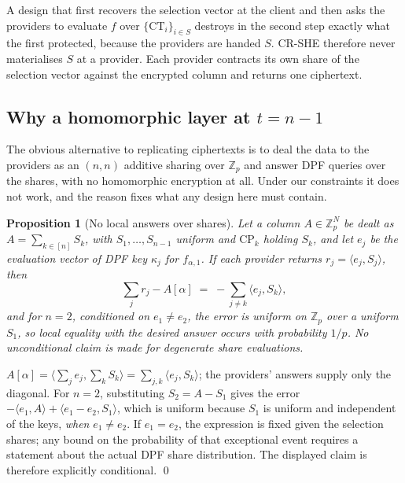\documentclass[a4paper,fleqn]{cas-sc}
\newtheorem{proposition}{Proposition}
\begin{document}
A design that first recovers the selection vector at the client and then asks
the providers to evaluate $f$ over $\{\text{CT}_i\}_{i\in S}$ destroys in the
second step exactly what the first protected, because the providers are handed
$S$. CR-SHE therefore never materialises $S$ at a provider. Each provider
contracts its own share of the selection vector against the encrypted column
and returns one ciphertext.

\subsection{Why a homomorphic layer at $t=n-1$}
\label{sec:whyrep}
The obvious alternative to replicating ciphertexts is to deal the data to the
providers as an $(n,n)$ additive sharing over $\mathbb{Z}_p$ and answer DPF
queries over the shares, with no homomorphic encryption at all. Under our
constraints it does not work, and the reason fixes what any design here must
contain.

\begin{proposition}[No local answers over shares]
\label{prop:nolocal}
Let a column $A\in\mathbb{Z}_p^N$ be dealt as $A=\sum_{k\in[n]}S_k$, with
$S_1,\dots,S_{n-1}$ uniform and $\text{CP}_k$ holding $S_k$, and let $e_j$ be
the evaluation vector of DPF key $\kappa_j$ for $f_{\alpha,1}$. If each
provider returns $r_j=\langle e_j,S_j\rangle$, then
\[
\textstyle\sum_{j} r_j - A[\alpha] \;=\; -\sum_{j\neq k}\langle e_j,S_k\rangle ,
\]
and for $n=2$, conditioned on $e_1\neq e_2$, the error is uniform
on $\mathbb{Z}_p$ over a uniform $S_1$, so local equality with
the desired answer occurs with probability $1/p$. No unconditional
claim is made for degenerate share evaluations.
\end{proposition}
\begin{pf}
$A[\alpha]=\langle\sum_j e_j,\sum_k S_k\rangle=\sum_{j,k}\langle e_j,S_k\rangle$;
the providers' answers supply only the diagonal. For $n=2$, substituting
$S_2=A-S_1$ gives the error $-\langle e_1,A\rangle+\langle e_1-e_2,S_1\rangle$,
which is uniform because $S_1$ is uniform and independent of the keys,
\emph{when} $e_1\neq e_2$. If $e_1=e_2$, the expression is fixed given
the selection shares; any bound on the probability of that exceptional event
requires a statement about the actual DPF share distribution. The displayed
claim is therefore explicitly conditional. \qed
\end{pf}
\end{document}
